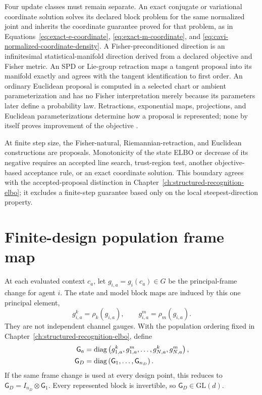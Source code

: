 Four update classes must remain separate. An exact conjugate or variational coordinate solution solves its declared block problem for the same normalized joint and inherits the coordinate guarantee proved for that problem, as in Equations~\eqref{eq:exact-e-coordinate}, \eqref{eq:exact-m-coordinate}, and \eqref{eq:cavi-normalized-coordinate-density}. A Fisher-preconditioned direction is an infinitesimal statistical-manifold direction derived from a declared objective and Fisher metric. An SPD or Lie-group retraction maps a tangent proposal into its manifold exactly and agrees with the tangent identification to first order. An ordinary Euclidean proposal is computed in a selected chart or ambient parameterization and has no Fisher interpretation merely because its parameters later define a probability law. Retractions, exponential maps, projections, and Euclidean parameterizations determine how a proposal is represented; none by itself proves improvement of the objective \citep{Absil2008,Bhatia2007,Bonnabel2013}.

At finite step size, the Fisher-natural, Riemannian-retraction, and Euclidean constructions are proposals. Monotonicity of the state ELBO or decrease of its negative requires an accepted line search, trust-region test, another objective-based acceptance rule, or an exact coordinate solution. This boundary agrees with the accepted-proposal distinction in Chapter~\ref{ch:structured-recognition-elbo}; it excludes a finite-step guarantee based only on the local steepest-direction property.

\section{Finite-design population frame map}

At each evaluated context \(c_a\), let \(g_{i,a}=g_i(c_a)\in G\) be the principal-frame change for agent \(i\). The state and model block maps are induced by this one principal element,
\begin{equation}
g_{i,a}^k=\rho_k(g_{i,a}),
\qquad
g_{i,a}^m=\rho_m(g_{i,a}).
\label{eq:finite-design-represented-frame-maps}
\end{equation}
They are not independent channel gauges. With the population ordering fixed in Chapter~\ref{ch:structured-recognition-elbo}, define
\begin{align}
\mathsf G_a
&=\operatorname{diag}
\left(g_{1,a}^k,g_{1,a}^m,\ldots,g_{N,a}^k,g_{N,a}^m\right),
\notag\\
\mathsf G_D
&=\operatorname{diag}
\left(\mathsf G_1,\ldots,\mathsf G_{n_D}\right).
\label{eq:finite-design-population-frame-map}
\end{align}
If the same frame change is used at every design point, this reduces to \(\mathsf G_D=I_{n_D}\otimes\mathsf G_1\). Every represented block is invertible, so \(\mathsf G_D\in\mathrm{GL}(d)\).

